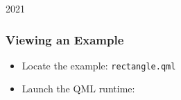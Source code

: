 
\begin{slide}[fragile]{2021}\frametitle{Viewing an Example}


\vspace*{1em}
\begin{itemize}
\item Locate the example: \texttt{rectangle.qml}
\item Launch the QML runtime:\\

%



\end{itemize}

\end{slide}


